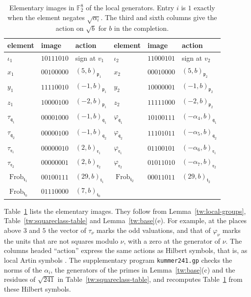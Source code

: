 \documentclass[11pt]{amsart}
\numberwithin{equation}{section}
\theoremstyle{definition}
\theoremstyle{remark}
\DeclareMathOperator{\Frob}{Frob}
\newcommand{\Ftwo}{\mathbb F_2}
\begin{document}
\begin{table}[htbp]
\centering
\caption{Elementary images in $\Ftwo^8$ of the local generators. Entry $i$
is $1$ exactly when the element negates $\sqrt{\alpha_i}$. The third and
sixth columns give the action on $\sqrt b$ for $b$ in the completion.}
\label{tw:vector-table}
\begin{tabular}{lll@{\qquad}lll}
\toprule
element & image & action & element & image & action\\
\midrule
$\iota_1$ & $10111010$ & sign at $v_1$ & $\iota_2$ & $11000101$ & sign at $v_2$\\
$x_1$ & $00100000$ & $(5,b)_{\mathfrak p_1}$ & $x_2$ & $00010000$ & $(5,b)_{\mathfrak p_2}$\\
$y_1$ & $11110010$ & $(-1,b)_{\mathfrak p_1}$ & $y_2$ & $10000001$ & $(-1,b)_{\mathfrak p_2}$\\
$z_1$ & $10000100$ & $(-2,b)_{\mathfrak p_1}$ & $z_2$ & $11111000$ & $(-2,b)_{\mathfrak p_2}$\\
$\tau_{\mathfrak q_1}$ & $00001000$ & $(-1,b)_{\mathfrak q_1}$ & $\varphi_{\mathfrak q_1}$ & $10100111$ & $(-\alpha_4,b)_{\mathfrak q_1}$\\
$\tau_{\mathfrak q_2}$ & $00000100$ & $(-1,b)_{\mathfrak q_2}$ & $\varphi_{\mathfrak q_2}$ & $11101011$ & $(-\alpha_5,b)_{\mathfrak q_2}$\\
$\tau_{\mathfrak r_1}$ & $00000010$ & $(2,b)_{\mathfrak r_1}$ & $\varphi_{\mathfrak r_1}$ & $01100101$ & $(-\alpha_6,b)_{\mathfrak r_1}$\\
$\tau_{\mathfrak r_2}$ & $00000001$ & $(2,b)_{\mathfrak r_2}$ & $\varphi_{\mathfrak r_2}$ & $01011010$ & $(-\alpha_7,b)_{\mathfrak r_2}$\\
$\Frob_{\mathfrak t_1}$ & $00100111$ & $(29,b)_{\mathfrak t_1}$ & $\Frob_{\mathfrak t_2}$ & $00011011$ & $(29,b)_{\mathfrak t_2}$\\
$\Frob_{\mathfrak t_0}$ & $01110000$ & $(7,b)_{\mathfrak t_0}$ & & &\\
\bottomrule
\end{tabular}
\end{table}

Table~\ref{tw:vector-table} lists the elementary images. They follow from
Lemma~\ref{tw:local-groups}, Table~\ref{tw:squareclass-table} and
Lemma~\ref{tw:base}(e). For
example, at the places above $3$ and $5$ the vector of $\tau_\nu$ marks the
odd valuations, and that of $\varphi_\nu$ marks the units that are not
squares modulo $\nu$, with a zero at the generator of $\nu$. The columns
headed ``action'' express the same actions as Hilbert symbols, that is, as
local Artin symbols \cite[Chapter~III, Remark~4.5]{MilneCFT}. The
supplementary program \texttt{kummer241.gp} checks the norms of the
$\alpha_i$, the generators of the primes in Lemma~\ref{tw:base}(c) and the
residues of $\sqrt{241}$ in Table~\ref{tw:squareclass-table}, and recomputes
Table~\ref{tw:vector-table} from these Hilbert symbols.
\end{document}
